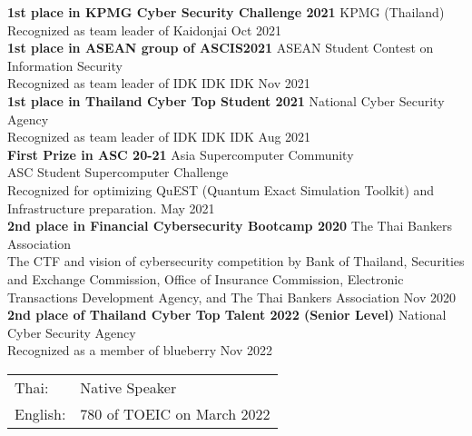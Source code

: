 \textbf{1st place in KPMG Cyber Security Challenge 2021} \hfill KPMG (Thailand)\\
Recognized as team leader of Kaidonjai \hfill Oct 2021\\
\vspace*{2mm}
\textbf{1st place in ASEAN group of ASCIS2021} \hfill ASEAN Student Contest on Information Security\\
Recognized as team leader of IDK IDK IDK \hfill Nov 2021\\
\vspace*{2mm}
\textbf{1st place in Thailand Cyber Top Student 2021} \hfill National Cyber Security Agency\\
Recognized as team leader of IDK IDK IDK \hfill Aug 2021\\
\vspace*{2mm}
\textbf{First Prize in ASC 20-21} \hfill Asia Supercomputer Community\\
ASC Student Supercomputer Challenge\\
Recognized for optimizing QuEST (Quantum Exact Simulation Toolkit) and Infrastructure preparation. \hfill May 2021\\
\vspace*{2mm}
\textbf{2nd place in Financial Cybersecurity Bootcamp 2020} \hfill The Thai Bankers\textquotesingle{} Association\\
The CTF and vision of cybersecurity competition by Bank of Thailand, Securities and Exchange Commission, Office of Insurance Commission, Electronic Transactions Development Agency, and The Thai Bankers\textquotesingle{} Association \hfill Nov 2020\\
\vspace*{2mm}
\textbf{2nd place of Thailand Cyber Top Talent 2022 (Senior Level)} \hfill National Cyber Security Agency\\
Recognized as a member of blueberry \hfill Nov 2022\\
\vspace*{2mm}


\begin{tabular}{ l l }
	Thai: & Native Speaker\\
	English:            & 780 of TOEIC on March 2022\\
\end{tabular}
\vspace{2mm}
